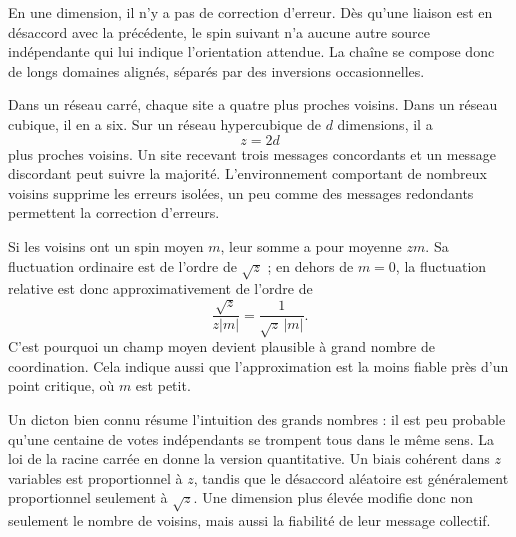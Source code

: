 En une dimension, il n’y a pas de correction d’erreur. Dès qu’une liaison est en désaccord avec la précédente, le spin suivant n’a aucune autre source indépendante qui lui indique l’orientation attendue. La chaîne se compose donc de longs domaines alignés, séparés par des inversions occasionnelles.

Dans un réseau carré, chaque site a quatre plus proches voisins. Dans un réseau cubique, il en a six. Sur un réseau hypercubique de \(d\) dimensions, il a
\begin{equation}
z=2d
\end{equation}
plus proches voisins. Un site recevant trois messages concordants et un message discordant peut suivre la majorité. L’environnement comportant de nombreux voisins supprime les erreurs isolées, un peu comme des messages redondants permettent la correction d’erreurs.

Si les voisins ont un spin moyen \(m\), leur somme a pour moyenne \(zm\). Sa fluctuation ordinaire est de l’ordre de \(\sqrt{z}\) ; en dehors de \(m=0\), la fluctuation relative est donc approximativement de l’ordre de
\begin{equation}
\frac{\sqrt{z}}{z|m|}
=\frac{1}{\sqrt{z}\,|m|}.
\end{equation}
C’est pourquoi un champ moyen devient plausible à grand nombre de coordination. Cela indique aussi que l’approximation est la moins fiable près d’un point critique, où \(m\) est petit.

Un dicton bien connu résume l’intuition des grands nombres : il est peu probable qu’une centaine de votes indépendants se trompent tous dans le même sens. La loi de la racine carrée en donne la version quantitative. Un biais cohérent dans \(z\) variables est proportionnel à \(z\), tandis que le désaccord aléatoire est généralement proportionnel seulement à \(\sqrt{z}\). Une dimension plus élevée modifie donc non seulement le nombre de voisins, mais aussi la fiabilité de leur message collectif.

\begin{classroomqa}\end{classroomqa}

